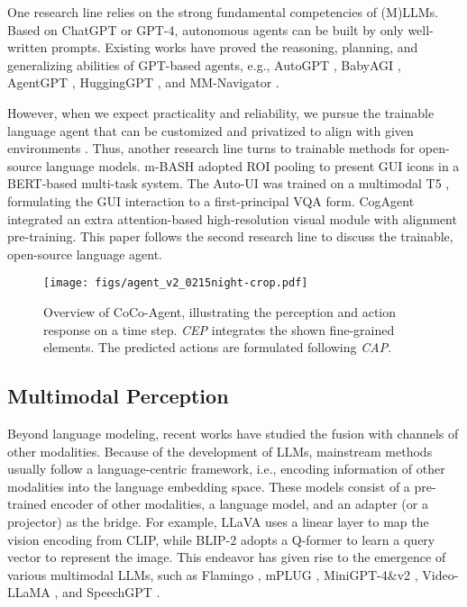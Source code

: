 One research line relies on the strong fundamental competencies of (M)LLMs. Based on ChatGPT or GPT-4, autonomous agents can be built by only well-written prompts. Existing works have proved the reasoning, planning, and generalizing abilities of GPT-based agents, e.g., AutoGPT \cite{autogpt}, BabyAGI \cite{babyagi}, AgentGPT \cite{agentgpt}, HuggingGPT \cite{shen2023hugginggpt}, and MM-Navigator \cite{yan2023gpt}.

However, when we expect practicality and reliability, we pursue the trainable language agent that can be customized and privatized to align with given environments \cite{shao-etal-2023-character}.
Thus, another research line turns to trainable methods for open-source language models. 
m-BASH \cite{sun2022meta} adopted ROI pooling to present GUI icons in a BERT-based multi-task system.
The Auto-UI \cite{zhang2023you} was trained on a multimodal T5 \cite{2020t5}, formulating the GUI interaction to a first-principal VQA form.
CogAgent \cite{hong2023cogagent} integrated an extra attention-based high-resolution visual module with alignment pre-training.
This paper follows the second research line to discuss the trainable, open-source language agent.

\begin{figure*}[h]
    \centering
    \texttt{[image: figs/agent\_v2\_0215night-crop.pdf]}
    \caption{Overview of CoCo-Agent, illustrating the perception and action response on a time step. \textit{CEP} integrates the shown fine-grained elements. The predicted actions are formulated following \textit{CAP}. }
    \label{overview}
\end{figure*}

\subsection{Multimodal Perception}
Beyond language modeling, recent works have studied the fusion with channels of other modalities.
Because of the development of LLMs, mainstream methods usually follow a language-centric framework, i.e., encoding information of other modalities into the language embedding space. These models consist of a pre-trained encoder of other modalities, a language model, and an adapter (or a projector) as the bridge.
For example, LLaVA \cite{liu2023llava} uses a linear layer to map the vision encoding from CLIP, while BLIP-2 \cite{li2023blip} adopts a Q-former to learn a query vector to represent the image.
This endeavor has given rise to the emergence of various multimodal LLMs, such as Flamingo \cite{alayrac2022flamingo}, mPLUG \cite{ye2023mplugowl}, MiniGPT-4\&v2 \cite{zhu2023minigpt, chen2023minigptv2}, Video-LLaMA \cite{damonlpsg2023videollama}, and SpeechGPT \cite{zhang2023speechgpt}.

